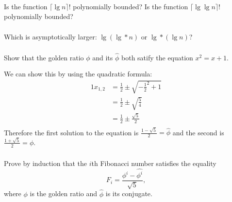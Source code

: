 \documentclass[11pt]{article}
\numberwithin{equation}{section}
\begin{document}
\subsubsection{}
Is the function $\lceil \lg n \rceil!$ polynomially bounded? Is the function 
$\lceil \lg \lg n \rceil!$ polynomially bounded?

\subsubsection{}
Which is asymptotically larger: $\lg(\lg* n)$ or $\lg*(\lg n)$?

\subsubsection{}
Show that the golden ratio $\phi$ and its $\widehat{\phi}$ both
satify the equation $x^2 = x + 1$.

We can show this by using the quadratic formula: 
\begin{alignat*}{1}
    x_{1,2} &= \frac{1}{2} \pm \sqrt{{-\frac{1}{2}}^2 + 1}\\
             &= \frac{1}{2} \pm \sqrt{\frac{5}{4}}\\
             &= \frac{1}{2} \pm \frac{\sqrt{5}}{2}\\
\end{alignat*}
Therefore the first solution to the equation is $\frac{1-\sqrt{5}}{2} = \widehat{\phi}$
and the second is $\frac{1+\sqrt{5}}{2} = \phi$.

\subsubsection{}
Prove by induction that the $i$th Fibonacci number satisfies the 
equality
\[
    F_i = \frac{\phi^i - \widehat{\phi^i}}{\sqrt{5}},
\]
where $\phi$ is the golden ratio and $\widehat{\phi}$ is its conjugate.
\end{document}
